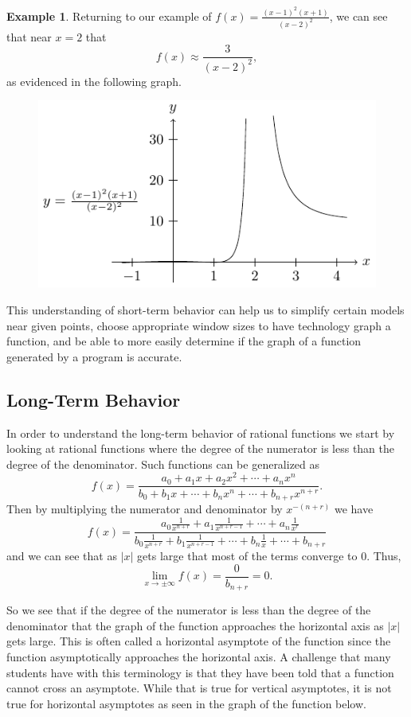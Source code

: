 \documentclass[
]{book}
\theoremstyle{definition}
\theoremstyle{definition}
\newtheorem{example}{Example}[chapter]
\theoremstyle{definition}
\theoremstyle{remark}
\begin{document}
\begin{example}
\protect\hypertarget{exm:unnamed-chunk-225}{}{\label{exm:unnamed-chunk-225} }Returning to our example of \(f(x)=\frac{(x-1)^2(x+1)}{(x-2)^2}\), we can see that near \(x=2\) that
\[f(x) \approx \frac{3}{(x-2)^2},\] as evidenced in the following graph.
\end{example}
\begin{figure}

{\centering \includegraphics[width=0.5\linewidth]{tikz/rational2} 

}

\end{figure}

This understanding of short-term behavior can help us to simplify certain models near given points, choose appropriate window sizes to have technology graph a function, and be able to more easily determine if the graph of a function generated by a program is accurate.

\hypertarget{long-term-behavior-1}{%
\subsection{Long-Term Behavior}\label{long-term-behavior-1}}

In order to understand the long-term behavior of rational functions we start by looking at rational functions where the degree of the numerator is less than the degree of the denominator. Such functions can be generalized as
\[f(x) = \frac{ a_0 + a_1 x + a_2 x^2 + \cdots + a_n x^n}{b_0 + b_1 x + \cdots + b_n x^n +\cdots +b_{n+r}x^{n+r}}.\]
Then by multiplying the numerator and denominator by \(x^{-(n+r)}\) we have
\[f(x) = \frac{ a_0\frac{1}{x^{n+r}} + a_1 \frac{1}{x^{n+r-1}} + \cdots + a_n \frac{1}{x^{r}}}{b_0 \frac{1}{x^{n+r}} + b_1 \frac{1}{x^{n+r-1}} + \cdots + b_n \frac{1}{x} +\cdots +b_{n+r}}\] and we can see that as \(|x|\) gets large that most of the terms converge to \(0\). Thus,
\[\lim_{x\rightarrow \pm \infty} f(x) = \frac{0}{b_{n+r}} = 0.\]

So we see that if the degree of the numerator is less than the degree of the denominator that the graph of the function approaches the horizontal axis as \(|x|\) gets large. This is often called a horizontal asymptote of the function since the function asymptotically approaches the horizontal axis. A challenge that many students have with this terminology is that they have been told that a function cannot cross an asymptote. While that is true for vertical asymptotes, it is not true for horizontal asymptotes as seen in the graph of the function below.
\end{document}
